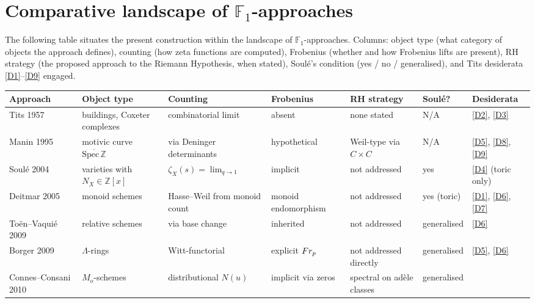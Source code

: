 \section{Comparative landscape of $\mathbb{F}_1$-approaches}
\label{app:comparison}

The following table situates the present construction within the
landscape of $\mathbb{F}_1$-approaches.  Columns: object type
(what category of objects the approach defines), counting
(how zeta functions are computed), Frobenius (whether and how
Frobenius lifts are present), RH strategy (the proposed approach
to the Riemann Hypothesis, when stated), Soul\'e's condition (yes
/ no / generalised), and Tits desiderata
\ref{D1}--\ref{D9} engaged.

\begin{center}
\footnotesize
\begin{tabular}{@{}p{2.5cm}p{2cm}p{2cm}p{1.8cm}p{2cm}p{1.5cm}p{2cm}@{}}
\toprule
Approach & Object type & Counting & Frobenius & RH strategy
& Soul\'e? & Desiderata \\
\midrule
Tits 1957~\cite{tits56}
  & buildings, Coxeter complexes
  & combinatorial limit
  & absent
  & none stated
  & N/A
  & \ref{D2}, \ref{D3} \\
Manin 1995~\cite{manin95}
  & motivic curve $\overline{\mathrm{Spec}\,\mathbb{Z}}$
  & via Deninger determinants
  & hypothetical
  & Weil-type via $C\times C$
  & N/A
  & \ref{D5}, \ref{D8}, \ref{D9} \\
Soul\'e 2004~\cite{soule03}
  & varieties with $N_X\in\mathbb{Z}[x]$
  & $\zeta_X(s) = \lim_{q\to 1}$
  & implicit
  & not addressed
  & yes
  & \ref{D4} (toric only) \\
Deitmar 2005~\cite{deitmar05}
  & monoid schemes
  & Hasse--Weil from monoid count
  & monoid endomorphism
  & not addressed
  & yes (toric)
  & \ref{D1}, \ref{D6}, \ref{D7} \\
To\"en--Vaqui\'e 2009~\cite{toen09}
  & relative schemes
  & via base change
  & inherited
  & not addressed
  & \hspace{0pt}generalised
  & \ref{D6} \\
Borger 2009~\cite{borger09}
  & $\Lambda$-rings
  & Witt-functorial
  & explicit $Fr_p$
  & not addressed directly
  & \hspace{0pt}generalised
  & \ref{D5}, \ref{D6} \\
Connes--Consani 2010~\cite{connesconsani10}
  & $M_o$-schemes
  & distributional $N(u)$
  & implicit via zeros
  & spectral on ad\`ele classes
  & \hspace{0pt}generalised

\end{tabular}
\end{center}
